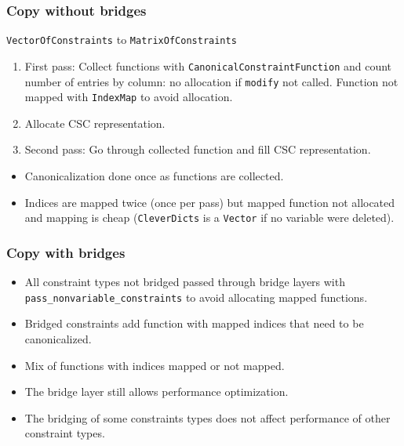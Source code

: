\documentclass{beamer}
\begin{document}
  \begin{frame}[fragile]
    \frametitle{Copy without bridges}
    \texttt{VectorOfConstraints} to \texttt{MatrixOfConstraints}
    \begin{enumerate}
      \item First pass: Collect functions with \texttt{CanonicalConstraintFunction}
        and \alert{count} number of entries by column: no allocation if \texttt{modify} not called. Function not mapped with \texttt{IndexMap} to avoid allocation.
      \item \alert{Allocate} CSC representation.
      \item Second pass: Go through collected function and
        \alert{fill} CSC representation.
    \end{enumerate}
    \begin{itemize}
      \item Canonicalization done \alert{once} as functions are collected.
      \item Indices are mapped \alert{twice} (once per pass) but mapped function not allocated and mapping is \alert{cheap} (\texttt{CleverDicts} is a \texttt{Vector} if no variable were deleted).
    \end{itemize}
  \end{frame}

  \begin{frame}[fragile]
    \frametitle{Copy with bridges}
    \begin{itemize}
      \item All constraint types not bridged passed \alert{through} bridge layers with \texttt{pass\_nonvariable\_constraints} to avoid \alert{allocating} mapped functions.
      \item Bridged constraints add function with \alert{mapped} indices that need to be canonicalized.
      \item \alert{Mix} of functions with indices mapped or not mapped.
    \end{itemize}
    \begin{itemize}
      \item The bridge layer still \alert{allows} performance optimization.
      \item The bridging of some constraints types does \alert{not affect} performance
        of other constraint types.
    \end{itemize}
  \end{frame}
\end{document}

